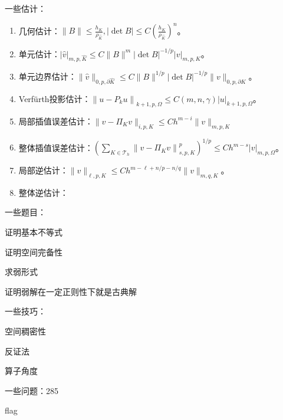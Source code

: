 一些估计：
\begin{enumerate}[]
  \item 几何估计：$\|B\| \le \frac{h_{K}}{\rho_{\widehat{K}}},|\operatorname{det} B| \le C\left(\frac{h_{K}}{\rho_{\widehat{K}}}\right)^{n}$。
  \item 单元估计：$|\widehat{v}|_{m, p, \widehat{K}} \le C\|B\|^{m}|\operatorname{det} B|^{-1 / p}|v|_{m, p, K}$。
  \item 单元边界估计：$\|\widehat{v}\|_{0, p, \partial \widehat{K}} \le C\|B\|^{1 / p}|\operatorname{det} B|^{-1 / p}\|v\|_{0, p, \partial K}$。
  \item Verfürth投影估计：$\left\|u-P_{k} u\right\|_{k+1, p, \Omega} \le C(m, n, \gamma)|u|_{k+1, p, \Omega}$。
  \item 局部插值误差估计：$\|v - \Pi_K v\|_{i, p, K} \le C h^{m - i} \|v\|_{m, p, K}$
  \item 整体插值误差估计：$\left(\sum_{K \in \mathcal{T}_{h}}\left\|v-\Pi_{K} v\right\|_{s, p, K}^{p}\right)^{1 / p} \le C h^{m-s}|v|_{m, p, \Omega}$。
  \item 局部逆估计：$\|v\|_{\ell, p, K} \le C h^{m-\ell+n / p-n / q}\|v\|_{m, q, K}$。
  \item 整体逆估计：
\end{enumerate}

一些题目：

证明基本不等式

证明空间完备性

求弱形式

证明弱解在一定正则性下就是古典解





一些技巧：

空间稠密性

反证法

算子角度

一些问题：285

flag
